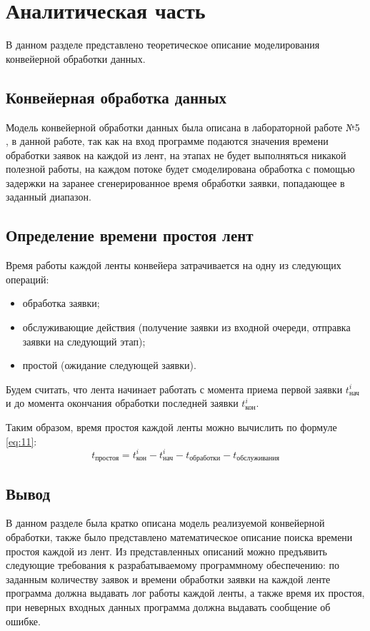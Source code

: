 \chapter{Аналитическая часть}

В данном разделе представлено теоретическое описание моделирования
конвейерной обработки данных.

\section{Конвейерная обработка данных}

Модель конвейерной обработки данных была описана в лабораторной работе №5
\cite{myReport}, в данной работе, так как на вход программе подаются значения
времени обработки заявок на каждой из лент, на этапах не будет выполняться
никакой полезной работы, на каждом потоке будет смоделирована обработка с
помощью задержки на заранее сгенерированное время обработки заявки, попадающее
в заданный диапазон.

\section{Определение времени простоя лент}

Время работы каждой ленты конвейера затрачивается на одну из следующих
операций:
\begin{itemize}
    \item обработка заявки;
    \item обслуживающие действия (получение заявки из входной очереди, отправка
          заявки на следующий этап);
    \item простой (ожидание следующей заявки).
\end{itemize}

Будем считать, что лента начинает работать с момента приема первой заявки
$t_{\text{нач}}^{i}$ и до момента окончания обработки последней заявки
$t_{\text{кон}}^{i}$. 

Таким образом, время простоя каждой ленты можно вычислить по формуле
\ref{eq:11}:
\begin{equation}\label{eq:11}
    t_{\text{простоя}} = t_{\text{кон}}^{i} - t_{\text{нач}}^{i}
                         - t_{\text{обработки}} - t_{\text{обслуживания}}
\end{equation}

\section{Вывод}

В данном разделе была кратко описана модель реализуемой конвейерной обработки,
также было представлено математическое описание поиска времени простоя каждой
из лент. Из представленных описаний можно предъявить следующие требования к
разрабатываемому программному обеспечению: по заданным количеству заявок и
времени обработки заявки на каждой ленте программа должна выдавать лог работы
каждой ленты, а также время их простоя, при неверных входных данных программа
должна выдавать сообщение об ошибке.
